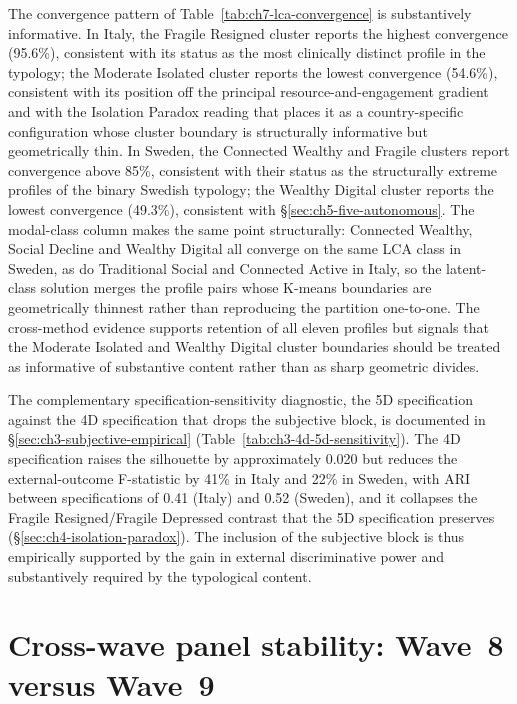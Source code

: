 The convergence pattern of Table~\ref{tab:ch7-lca-convergence} is substantively informative. In Italy, the Fragile Resigned cluster reports the highest convergence (95.6\%), consistent with its status as the most clinically distinct profile in the typology; the Moderate Isolated cluster reports the lowest convergence (54.6\%), consistent with its position off the principal resource-and-engagement gradient and with the Isolation Paradox reading that places it as a country-specific configuration whose cluster boundary is structurally informative but geometrically thin. In Sweden, the Connected Wealthy and Fragile clusters report convergence above 85\%, consistent with their status as the structurally extreme profiles of the binary Swedish typology; the Wealthy Digital cluster reports the lowest convergence (49.3\%), consistent with \S\ref{sec:ch5-five-autonomous}. The modal-class column makes the same point structurally: Connected Wealthy, Social Decline and Wealthy Digital all converge on the same LCA class in Sweden, as do Traditional Social and Connected Active in Italy, so the latent-class solution merges the profile pairs whose K-means boundaries are geometrically thinnest rather than reproducing the partition one-to-one. The cross-method evidence supports retention of all eleven profiles but signals that the Moderate Isolated and Wealthy Digital cluster boundaries should be treated as informative of substantive content rather than as sharp geometric divides.

The complementary specification-sensitivity diagnostic, the 5D specification against the 4D specification that drops the subjective block, is documented in \S\ref{sec:ch3-subjective-empirical} (Table~\ref{tab:ch3-4d-5d-sensitivity}). The 4D specification raises the silhouette by approximately 0.020 but reduces the external-outcome F-statistic by 41\% in Italy and 22\% in Sweden, with ARI between specifications of 0.41 (Italy) and 0.52 (Sweden), and it collapses the Fragile Resigned/Fragile Depressed contrast that the 5D specification preserves (\S\ref{sec:ch4-isolation-paradox}). The inclusion of the subjective block is thus empirically supported by the gain in external discriminative power and substantively required by the typological content.

\section{Cross-wave panel stability: Wave~8 versus Wave~9}
\label{sec:ch7-cross-wave}

